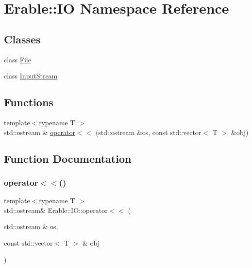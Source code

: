 \hypertarget{namespace_erable_1_1_i_o}{}\section{Erable\+::IO Namespace Reference}
\label{namespace_erable_1_1_i_o}
\subsection*{Classes}
\begin{DoxyCompactItemize}
\item 
class \mbox{\hyperlink{class_erable_1_1_i_o_1_1_file}{File}}
\item 
class \mbox{\hyperlink{class_erable_1_1_i_o_1_1_input_stream}{Input\+Stream}}
\end{DoxyCompactItemize}
\subsection*{Functions}
\begin{DoxyCompactItemize}
\item 
{\footnotesize template$<$typename T $>$ }\\std\+::ostream \& \mbox{\hyperlink{namespace_erable_1_1_i_o_a8c3530559ae09ae0c9df65a714b98353}{operator$<$$<$}} (std\+::ostream \&os, const std\+::vector$<$ T $>$ \&obj)
\end{DoxyCompactItemize}


\subsection{Function Documentation}
\mbox{\label{namespace_erable_1_1_i_o_a8c3530559ae09ae0c9df65a714b98353}} 
\subsubsection{\texorpdfstring{operator$<$$<$()}{operator<<()}}
{\footnotesize\ttfamily template$<$typename T $>$ \\
std\+::ostream\& Erable\+::\+I\+O\+::operator$<$$<$ (\begin{DoxyParamCaption}\item[{std\+::ostream \&}]{os,  }\item[{const std\+::vector$<$ T $>$ \&}]{obj }\end{DoxyParamCaption})}

